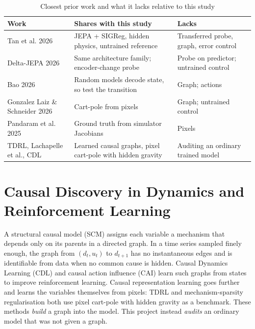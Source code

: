 \documentclass[11pt, a4paper, oneside,enumerate,textcomp]{report}
\begin{document}
\begin{table}[htbp]
\caption{Closest prior work and what it lacks relative to this study}
\centering
\small
\begin{tabular}{| p{4.0cm} | p{5.2cm} | p{4.4cm} |}
\hline
\textbf{Work} & \textbf{Shares with this study} & \textbf{Lacks} \\
\hline
Tan et al. 2026 \cite{tan2026latent} & JEPA + SIGReg, hidden physics, untrained reference & Transferred probe, graph, error control \\
\hline
Delta-JEPA 2026 \cite{zhang2026deltajepa} & Same architecture family; encoder-change probe & Probe on predictor; untrained control \\
\hline
Bao 2026 \cite{bao2026correcting} & Random models decode state, so test the transition & Graph; actions \\
\hline
Gonzalez Laiz \& Schneider 2026 \cite{gonzalez2026limits} & Cart-pole from pixels & Graph; untrained control \\
\hline
Pandaram et al. 2025 \cite{pandaram2025sparsity} & Ground truth from simulator Jacobians & Pixels \\
\hline
TDRL, Lachapelle et al., CDL \cite{yao2022tdrl,lachapelle2022disentanglement,wang2022cdl} & Learned causal graphs, pixel cart-pole with hidden gravity & Auditing an ordinary trained model \\
\hline
\end{tabular}
\label{tab:closest}
\end{table}

\section{Causal Discovery in Dynamics and Reinforcement Learning}

A structural causal model (SCM) \cite{pearl2009causality} assigns each variable a mechanism that depends only on its parents in a directed graph. In a time series sampled finely enough, the graph from $(d_t, u_t)$ to $d_{t+1}$ has no instantaneous edges and is identifiable from data when no common cause is hidden. Causal Dynamics Learning (CDL) \cite{wang2022cdl} and causal action influence (CAI) \cite{seitzer2021cai} learn such graphs from states to improve reinforcement learning. Causal representation learning goes further and learns the variables themselves from pixels: TDRL \cite{yao2022tdrl} and mechanism-sparsity regularisation \cite{lachapelle2022disentanglement} both use pixel cart-pole with hidden gravity as a benchmark. These methods \emph{build} a graph into the model. This project instead \emph{audits} an ordinary model that was not given a graph.
\end{document}
